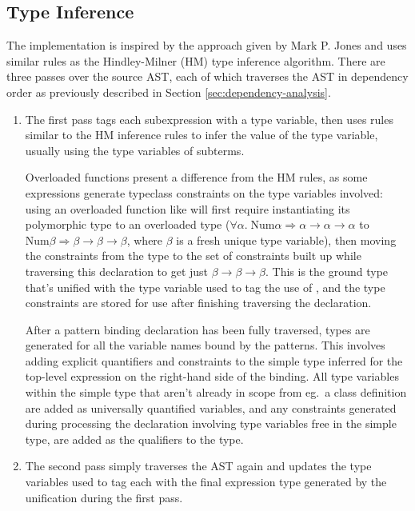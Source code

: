 \documentclass[dissertation.tex]{subfiles}
\begin{document}
{    \subsection{Type Inference}
    {
        The implementation is inspired by the approach given by Mark P. Jones\cite{THIH} and uses similar rules as the Hindley-Milner (HM) type inference algorithm. There are three passes over the source AST, each of which traverses the AST in dependency order as previously described in Section \ref{sec:dependency-analysis}.

        \begin{enumerate}
        \item
        {
            The first pass tags each subexpression with a type variable, then uses rules similar to the HM inference rules to infer the value of the type variable, usually using the type variables of subterms.
            
            Overloaded functions present a difference from the HM rules, as some expressions generate typeclass constraints on the type variables involved: using an overloaded function like \haskell{(+)} will first require instantiating its polymorphic type to an overloaded type (\(\forall\alpha.\;\text{Num}\alpha\Rightarrow\alpha\rightarrow\alpha\rightarrow\alpha\) to \(\text{Num}\beta\Rightarrow\beta\rightarrow\beta\rightarrow\beta\), where \(\beta\) is a fresh unique type variable), then moving the constraints from the type to the set of constraints built up while traversing this declaration to get just \(\beta\rightarrow\beta\rightarrow\beta\). This is the ground type that's unified with the type variable used to tag the use of \haskell{(+)}, and the type constraints are stored for use after finishing traversing the declaration.

            After a pattern binding declaration has been fully traversed, types are generated for all the variable names bound by the patterns. This involves adding explicit quantifiers and constraints to the simple type inferred for the top-level expression on the right-hand side of the binding. All type variables within the simple type that aren't already in scope from eg.\ a class definition are added as universally quantified variables, and any constraints generated during processing the declaration involving type variables free in the simple type, are added as the qualifiers to the type.
        }
        \item
        {
            The second pass simply traverses the AST again and updates the type variables used to tag each with the final expression type generated by the unification during the first pass.
            
}
\end{enumerate}}}
\end{document}
